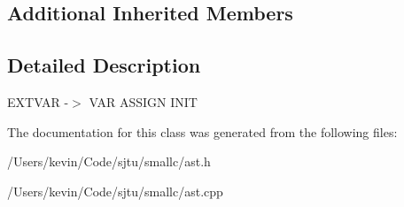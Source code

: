 \subsection*{Additional Inherited Members}


\subsection{Detailed Description}
E\+X\+T\+V\+AR -\/$>$ V\+AR A\+S\+S\+I\+GN I\+N\+IT 

The documentation for this class was generated from the following files\+:\begin{DoxyCompactItemize}
\item 
/\+Users/kevin/\+Code/sjtu/smallc/ast.\+h\item 
/\+Users/kevin/\+Code/sjtu/smallc/ast.\+cpp\end{DoxyCompactItemize}
